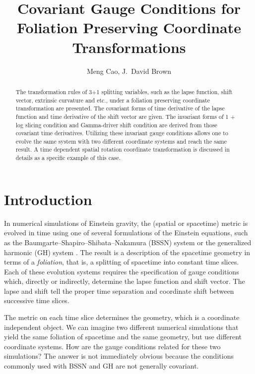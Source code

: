 \documentclass[letterpaper,nofootinbib,prd,amsmath,onecolumn]{revtex4-1}
\begin{document}

\title{Covariant Gauge Conditions for Foliation Preserving Coordinate Transformations}
\author{Meng Cao, J.~David Brown}

\begin{abstract}
The transformation rules of 3+1 splitting variables, such as the lapse function, shift vector, extrinsic curvature and etc., under a foliation preserving coordinate transformation are presented. The covariant forms of time derivative of the lapse function and time derivative of the shift vector are given. The invariant forms of 1 + log slicing condition and Gamma-driver shift condition are derived from those covariant time derivatives. Utilizing these invariant gauge conditions allows one to evolve the same system with two different coordinate systems and reach the same result. A time dependent spatial rotation coordinate transformation is discussed in details as a specific example of this case.  
\end{abstract}
\maketitle

\section{Introduction}
In numerical simulations of Einstein gravity, the (spatial or spacetime) metric is evolved in time using one of several formulations of the Einstein equations, such as the 
Baumgarte--Shapiro--Shibata--Nakamura (BSSN) system \cite{Shibata:1995we,Baumgarte:1998te} or the generalized harmonic (GH) 
system \cite{Friedrich:1985,Garfinkle:2001ni,Pretorius:2006tp}. The result is a description of the spacetime geometry in terms of a {\em foliation}, that is, a splitting of spacetime into 
constant time slices. 
Each of these evolution systems requires the specification of gauge conditions which, directly or indirectly, determine the lapse function and shift vector. 
The lapse and shift tell the proper time separation and coordinate shift between successive time slices. 

The metric on each time slice determines the geometry, which is a coordinate independent object. We can imagine two different numerical simulations that yield the 
same foliation of spacetime and the same geometry, but use different coordinate systems. How are the gauge conditions related for these two simulations? The 
answer is not immediately obvious because the conditions commonly used with BSSN and GH are not generally covariant. 
\end{document}
